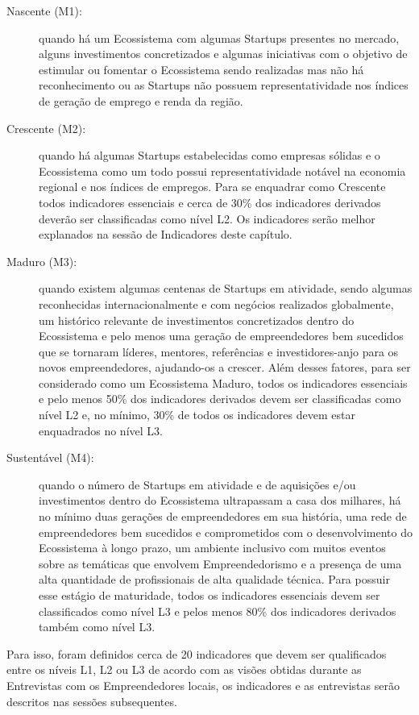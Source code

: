\begin{description}
  \item [Nascente (M1):] quando há um Ecossistema com algumas Startups presentes no mercado, alguns investimentos concretizados e algumas iniciativas com o objetivo de estimular ou fomentar o Ecossistema sendo realizadas mas não há reconhecimento ou as Startups não possuem representatividade nos índices de geração de emprego e renda da região.

  \item [Crescente (M2):] quando há algumas Startups estabelecidas como empresas sólidas e o Ecossistema como um todo possui representatividade notável na economia regional e nos índices de empregos. Para se enquadrar como Crescente todos indicadores essenciais e cerca de 30\% dos indicadores derivados deverão ser classificadas como nível L2. Os indicadores serão melhor explanados na sessão de Indicadores deste capítulo.

  \item [Maduro (M3):] quando existem algumas centenas de Startups em atividade, sendo algumas reconhecidas internacionalmente e com negócios realizados globalmente, um histórico relevante de investimentos concretizados dentro do Ecossistema e pelo menos uma geração de empreendedores bem sucedidos que se tornaram líderes, mentores, referências e investidores-anjo para os novos empreendedores, ajudando-os a crescer. Além desses fatores, para ser considerado como um Ecossistema Maduro, todos os indicadores essenciais e pelo menos 50\% dos indicadores derivados devem ser classificadas como nível L2 e, no mínimo, 30\% de todos os indicadores devem estar enquadrados no nível L3.

  \item [Sustentável (M4):] quando o número de Startups em atividade e de aquisições e/ou investimentos dentro do Ecossistema ultrapassam a casa dos milhares, há no mínimo duas gerações de empreendedores em sua história, uma rede de empreendedores bem sucedidos e comprometidos com o desenvolvimento do Ecossistema à longo prazo, um ambiente inclusivo com muitos eventos sobre as temáticas que envolvem Empreendedorismo e a presença de uma alta quantidade de profissionais de alta qualidade técnica. Para possuir esse estágio de maturidade, todos os indicadores essenciais devem ser classificados como nível L3 e pelos menos 80\% dos indicadores derivados também como nível L3.
\end{description}

Para isso, foram definidos cerca de 20 indicadores que devem ser qualificados entre os níveis L1, L2 ou L3 de acordo com as visões obtidas durante as Entrevistas com os Empreendedores locais, os indicadores e as entrevistas serão descritos nas sessões subsequentes. 

